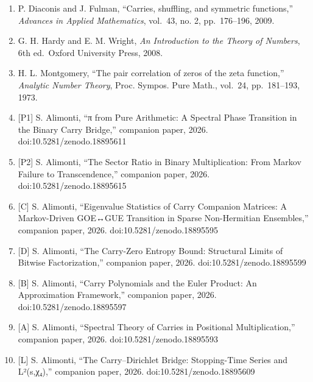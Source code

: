\documentclass[
  11pt,
]{article}
\begin{document}
\begin{enumerate}
\def\labelenumi{\arabic{enumi}.}
\item
  P. Diaconis and J. Fulman, ``Carries, shuffling, and symmetric functions,''
  \emph{Advances in Applied Mathematics}, vol.~43, no. 2, pp.~176--196, 2009.
\item
  G. H. Hardy and E. M. Wright, \emph{An Introduction to the Theory of Numbers},
  6th ed.~Oxford University Press, 2008.
\item
  H. L. Montgomery, ``The pair correlation of zeros of the zeta function,''
  \emph{Analytic Number Theory}, Proc. Sympos. Pure Math., vol.~24,
  pp.~181--193, 1973.
\item
  {[}P1{]} S. Alimonti, ``π from Pure Arithmetic: A Spectral Phase Transition in
  the Binary Carry Bridge,'' companion paper, 2026. doi:10.5281/zenodo.18895611
\item
  {[}P2{]} S. Alimonti, ``The Sector Ratio in Binary Multiplication: From Markov
  Failure to Transcendence,'' companion paper, 2026. doi:10.5281/zenodo.18895615
\item
  {[}C{]} S. Alimonti, ``Eigenvalue Statistics of Carry Companion Matrices: A
  Markov-Driven GOE↔GUE Transition in Sparse Non-Hermitian Ensembles,''
  companion paper, 2026. doi:10.5281/zenodo.18895595
\item
  {[}D{]} S. Alimonti, ``The Carry-Zero Entropy Bound: Structural Limits of
  Bitwise Factorization,'' companion paper, 2026. doi:10.5281/zenodo.18895599
\item
  {[}B{]} S. Alimonti, ``Carry Polynomials and the Euler Product: An
  Approximation Framework,'' companion paper, 2026. doi:10.5281/zenodo.18895597
\item
  {[}A{]} S. Alimonti, ``Spectral Theory of Carries in Positional
  Multiplication,'' companion paper, 2026. doi:10.5281/zenodo.18895593
\item
  {[}L{]} S. Alimonti, ``The Carry--Dirichlet Bridge: Stopping-Time Series and
  L²(s,χ₄),'' companion paper, 2026. doi:10.5281/zenodo.18895609
\end{enumerate}
\end{document}
